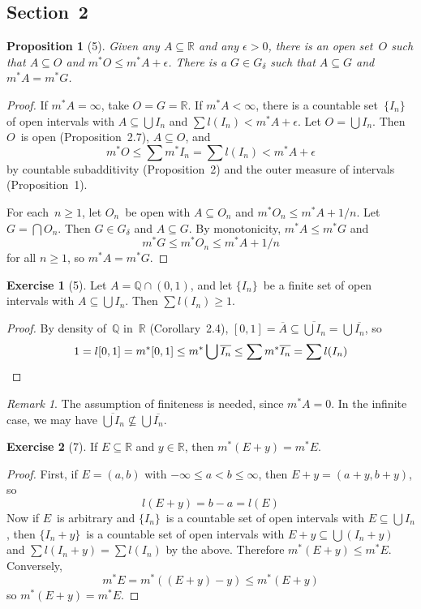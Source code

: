 \documentclass[letterpaper,12pt]{article}
\newcommand{\Q}{\mathbb{Q}}
\newcommand{\R}{\mathbb{R}}
\newcommand{\Gd}{G_{\delta}}
\newcommand{\sect}{\cap}
\newcommand{\bigunion}{\bigcup}
\newcommand{\bigsect}{\bigcap}
\newcommand{\len}{l}
\newcommand{\mo}{m^*}
\newcommand{\closure}[1]{\overline{#1}}
\theoremstyle{plain}
\newtheorem*{prop}{Proposition}
\theoremstyle{definition}
\newtheorem*{exer}{Exercise}
\theoremstyle{remark}
\newtheorem*{rmk}{Remark}
\begin{document}
\subsection*{Section~2}
\begin{prop}[5]
Given any \(A\subseteq\R\) and any \(\epsilon>0\), there is an open set~\(O\) such that \(A\subseteq O\) and \(\mo O\le\mo A+\epsilon\). There is a \(G\in\Gd\) such that \(A\subseteq G\) and \(\mo A=\mo G\).
\end{prop}
\begin{proof}
If \(\mo A=\infty\), take \(O=G=\R\). If \(\mo A<\infty\), there is a countable set~\(\{I_n\}\) of open intervals with \(A\subseteq\bigunion I_n\) and \(\sum\len(I_n)<\mo A+\epsilon\). Let \(O=\bigunion I_n\). Then \(O\)~is open (Proposition~2.7), \(A\subseteq O\), and
\[\mo O\le\sum\mo I_n=\sum\len(I_n)<\mo A+\epsilon\]
by countable subadditivity (Proposition~2) and the outer measure of intervals (Proposition~1).

For each~\(n\ge 1\), let \(O_n\)~be open with \(A\subseteq O_n\) and \(\mo O_n\le\mo A+1/n\). Let \(G=\bigsect O_n\). Then \(G\in\Gd\) and \(A\subseteq G\). By monotonicity, \(\mo A\le\mo G\) and
\[\mo G\le\mo O_n\le\mo A+1/n\]
for all \(n\ge 1\), so \(\mo A=\mo G\).
\end{proof}

\begin{exer}[5]
Let \(A=\Q\sect(0,1)\), and let \(\{I_n\}\)~be a finite set of open intervals with \(A\subseteq\bigunion I_n\). Then \(\sum\len(I_n)\ge 1\).
\end{exer}
\begin{proof}
By density of~\(\Q\) in~\(\R\) (Corollary~2.4), \([0,1]=\closure{A}\subseteq\closure{\bigunion I_n}=\bigunion\closure{I_n}\), so
\[1=\len[0,1]=\mo[0,1]\le\mo\bigunion\closure{I_n}\le\sum\mo\closure{I_n}=\sum\len(I_n)\qedhere\]
\end{proof}
\begin{rmk}
The assumption of finiteness is needed, since \(\mo A=0\). In the infinite case, we may have \(\closure{\bigunion I_n}\not\subseteq\bigunion\closure{I_n}\).
\end{rmk}

\begin{exer}[7]
If \(E\subseteq\R\) and \(y\in\R\), then \(\mo(E+y)=\mo E\).
\end{exer}
\begin{proof}
First, if \(E=(a,b)\) with \(-\infty\le a<b\le\infty\), then \(E+y=(a+y,b+y)\), so
\[\len(E+y)=b-a=\len(E)\]
Now if \(E\)~is arbitrary and \(\{I_n\}\)~is a countable set of open intervals with \(E\subseteq\bigunion I_n\), then \(\{I_n+y\}\)~is a countable set of open intervals with \(E+y\subseteq\bigunion(I_n+y)\) and \(\sum\len(I_n+y)=\sum\len(I_n)\) by the above. Therefore \(\mo(E+y)\le\mo E\). Conversely,
\[\mo E=\mo((E+y)-y)\le\mo(E+y)\]
so \(\mo(E+y)=\mo E\).
\end{proof}
\end{document}
